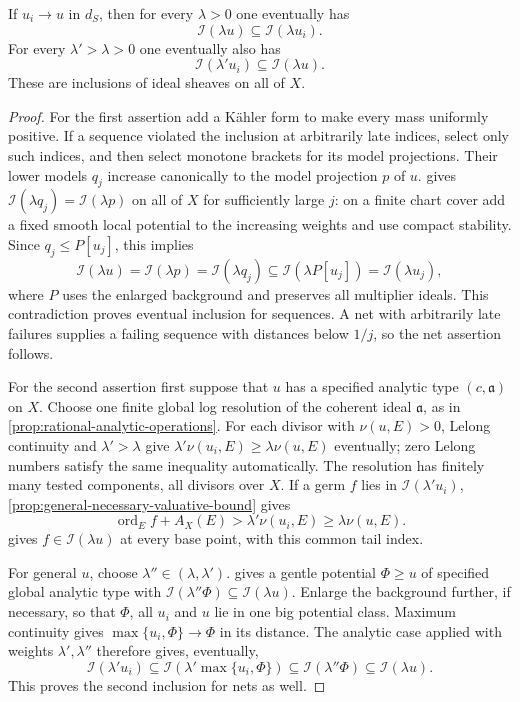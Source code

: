 \begin{theorem}\label{thm:singularity-multiplier-ideal-stability}
If $u_i\to u$ in $d_S$, then for every $\lambda>0$ one eventually has
\[
 \mathcal I(\lambda u)\subseteq\mathcal I(\lambda u_i).
\]
For every $\lambda'>\lambda>0$ one eventually also has
\[
 \mathcal I(\lambda'u_i)\subseteq\mathcal I(\lambda u).
\]
These are inclusions of ideal sheaves on all of $X$.
\end{theorem}
\begin{proof}
For the first assertion add a K\"ahler form to make every mass uniformly positive. If a sequence violated the inclusion at arbitrarily late indices, select only such indices, and then select monotone brackets for its model projections. Their lower models $q_j$ increase canonically to the model projection $p$ of $u$.  gives
$\mathcal I(\lambda q_j)=\mathcal I(\lambda p)$ on all of $X$ for sufficiently large $j$: on a finite chart cover add a fixed smooth local potential to the increasing weights and use compact stability. Since $q_j\leq P[u_j]$, this implies
\[
 \mathcal I(\lambda u)=\mathcal I(\lambda p)
     =\mathcal I(\lambda q_j)
     \subseteq\mathcal I(\lambda P[u_j])=\mathcal I(\lambda u_j),
\]
where $P$ uses the enlarged background and preserves all multiplier ideals. This contradiction proves eventual inclusion for sequences. A net with arbitrarily late failures supplies a failing sequence with distances below $1/j$, so the net assertion follows.

For the second assertion first suppose that $u$ has a specified analytic type $(c,\mathfrak a)$ on $X$. Choose one finite global log resolution of the coherent ideal $\mathfrak a$, as in \cref{prop:rational-analytic-operations}. For each divisor with $\nu(u,E)>0$, Lelong continuity and $\lambda'>\lambda$ give
$\lambda'\nu(u_i,E)\geq\lambda\nu(u,E)$ eventually; zero Lelong numbers satisfy the same inequality automatically. The resolution has finitely many tested components, all divisors over $X$. If a germ $f$ lies in $\mathcal I(\lambda'u_i)$, \cref{prop:general-necessary-valuative-bound} gives
\[
 \operatorname{ord}_Ef+A_X(E)>\lambda'\nu(u_i,E)
                                      \geq\lambda\nu(u,E).
\]
 gives $f\in\mathcal I(\lambda u)$ at every base point, with this common tail index.

For general $u$, choose $\lambda''\in(\lambda,\lambda')$.  gives a gentle potential $\Phi\geq u$ of specified global analytic type with
$\mathcal I(\lambda''\Phi)\subseteq\mathcal I(\lambda u)$. Enlarge the background further, if necessary, so that $\Phi$, all $u_i$ and $u$ lie in one big potential class. Maximum continuity gives $\max\{u_i,\Phi\}\to\Phi$ in its distance. The analytic case applied with weights $\lambda',\lambda''$ therefore gives, eventually,
\[
 \mathcal I(\lambda'u_i)
 \subseteq\mathcal I(\lambda'\max\{u_i,\Phi\})
 \subseteq\mathcal I(\lambda''\Phi)
 \subseteq\mathcal I(\lambda u).
\]
This proves the second inclusion for nets as well.
\end{proof}

